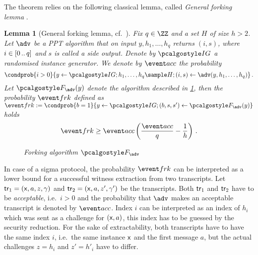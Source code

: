 \documentclass[runningheads,11pt]{llncs}
\newtheorem{lemma}[theorem]{Lemma}
\theoremstyle{definition}
\begin{document}
The theorem relies on the following classical lemma, called \emph{General forking lemma} \cite{JC:PoiSte00}.

\begin{lemma}[General forking lemma, cf.~\cite{INDOCRYPT:FKMV12,CCS:BelNev06}]
	\label{lem:forking_lemma}
	Fix $q \in \ZZ$ and a set $H$ of size $h > 2$. Let $\adv$ be a PPT algorithm that on input $y, h_1, \ldots, h_q$ returns $(i, s)$, where $i \in[0 \, .. \, q]$ and $s$ is called a \emph{side output}.
	Denote by $\ig$ a randomised instance generator.
	We denote by $\accProb$ the probability
	\[
		\condprob{i > 0}{y \gets \ig; h_1, \ldots, h_q \sample H; (i, s) \gets \adv(y, h_1, \ldots, h_q)}\,.
	\]
	Let $\forking_\adv(y)$ denote the algorithm described in \cref{fig:forking_lemma}, then the probability $\frkProb$ defined as
	$
		\frkProb := \condprob{b = 1}{y \gets \ig; (b, s, s') \gets \forking_{\adv}(y)}
	$
	holds
	\[
		\frkProb \geq \accProb \brak{\frac{\accProb}{q} - \frac{1}{h}}\,.
	\]
	\begin{figure}
		\centering
		\caption{Forking algorithm $\forking_\adv$}
		\label{fig:forking_lemma}
\end{figure}
\end{lemma}
%
In case of a sigma protocol, the probability $\frkProb$ can be interpreted as a lower bound for a successful witness extraction from two transcripts.
Let $\mathsf{tr}_1 = (\mathsf{x}, a, z, \gamma)$ and $\mathsf{tr}_2 = (\mathsf{x}, a, z', \gamma')$ be the transcripts.
Both $\mathsf{tr}_1$ and $\mathsf{tr}_2$ have to be \emph{acceptable}, i.e.~$i > 0$ and the probability that $\adv$ makes an acceptable transcript is denoted by $\accProb$. 
Index $i$ can be interpreted as an index of $h_i$ which was sent as a challenge for $(\mathsf{x}, a)$, this index has to be guessed by the security reduction. 
For the sake of extractability, both transcripts have to have the same index $i$, i.e.~the same instance $\mathsf{x}$ and the first message $a$, but the actual challenges $z = h_i$ and $z' = h'_{i}$ have to differ.
\end{document}
